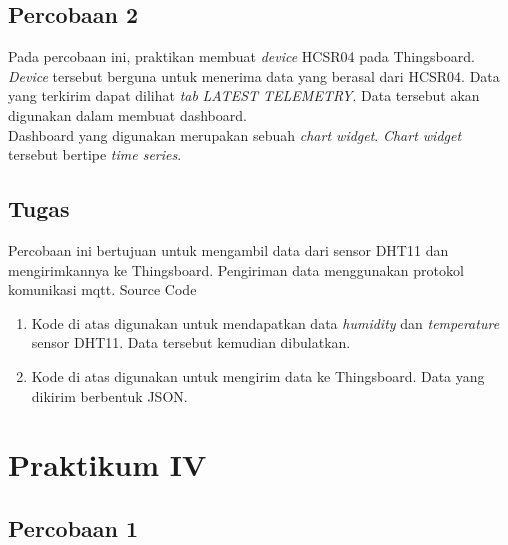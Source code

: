 \documentclass{class}
\begin{document}
    \subsection{Percobaan 2}
    Pada percobaan ini, praktikan membuat \emph{device} HCSR04 pada Thingsboard.
    \emph{Device} tersebut berguna untuk menerima data yang berasal dari HCSR04. 
    Data yang terkirim dapat dilihat \emph{tab} \emph{LATEST TELEMETRY}.
    Data tersebut akan digunakan dalam membuat dashboard. \\
    Dashboard yang digunakan merupakan sebuah \emph{chart widget}.
    \emph{Chart widget} tersebut bertipe \emph{time series}.
    \subsection{Tugas}
    Percobaan ini bertujuan untuk mengambil data dari sensor DHT11 dan mengirimkannya ke Thingsboard. 
    Pengiriman data menggunakan protokol komunikasi mqtt. 
    Source Code
    \begin{enumerate}
      \item 
      Kode di atas digunakan untuk mendapatkan data \emph{humidity} dan \emph{temperature} sensor DHT11.
      Data tersebut kemudian dibulatkan.
      \item 
      Kode di atas digunakan untuk mengirim data ke Thingsboard.
      Data yang dikirim berbentuk JSON. \\
    \end{enumerate}
  \section{Praktikum IV}
  \subsection{Percobaan 1}
\end{document}
